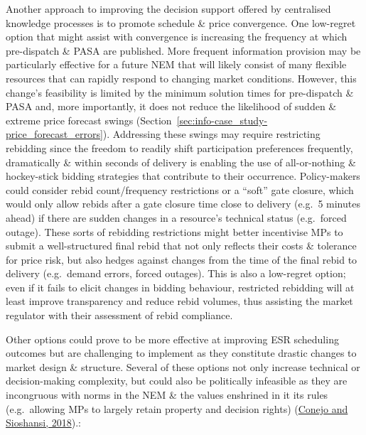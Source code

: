 \documentclass[12pt,a4paper,]{report}
\begin{document}
Another approach to improving the decision support offered by
centralised knowledge processes is to promote schedule \& price
convergence. One low-regret option that might assist with convergence is
increasing the frequency at which pre-dispatch \& PASA are published.
More frequent information provision may be particularly effective for a
future NEM that will likely consist of many flexible resources that can
rapidly respond to changing market conditions. However, this change's
feasibility is limited by the minimum solution times for pre-dispatch \&
PASA and, more importantly, it does not reduce the likelihood of sudden
\& extreme price forecast swings
(Section~\ref{sec:info-case_study-price_forecast_errors}). Addressing
these swings may require restricting rebidding since the freedom to
readily shift participation preferences frequently, dramatically \&
within seconds of delivery is enabling the use of all-or-nothing \&
hockey-stick bidding strategies that contribute to their occurrence.
Policy-makers could consider rebid count/frequency restrictions or a
``soft'' gate closure, which would only allow rebids after a gate
closure time close to delivery (e.g.~5 minutes ahead) if there are
sudden changes in a resource's technical status (e.g.~forced outage).
These sorts of rebidding restrictions might better incentivise MPs to
submit a well-structured final rebid that not only reflects their costs
\& tolerance for price risk, but also hedges against changes from the
time of the final rebid to delivery (e.g.~demand errors, forced
outages). This is also a low-regret option; even if it fails to elicit
changes in bidding behaviour, restricted rebidding will at least improve
transparency and reduce rebid volumes, thus assisting the market
regulator with their assessment of rebid compliance.

Other options could prove to be more effective at improving ESR
scheduling outcomes but are challenging to implement as they constitute
drastic changes to market design \& structure. Several of these options
not only increase technical or decision-making complexity, but could
also be politically infeasible as they are incongruous with norms in the
NEM \& the values enshrined in it its rules (e.g.~allowing MPs to
largely retain property and decision rights)
(\protect\hyperlink{ref-conejoRethinkingRestructuredElectricity2018}{Conejo
and Sioshansi, 2018}).:
\end{document}
